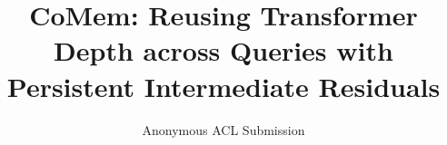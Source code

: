\documentclass[11pt]{article}
\title{CoMem: Reusing Transformer Depth across Queries with
Persistent Intermediate Residuals}
\author{Anonymous ACL Submission}
\begin{document}
\maketitle







\FloatBarrier


\FloatBarrier
\clearpage


\clearpage



\clearpage
\appendix
\raggedbottom


\end{document}

